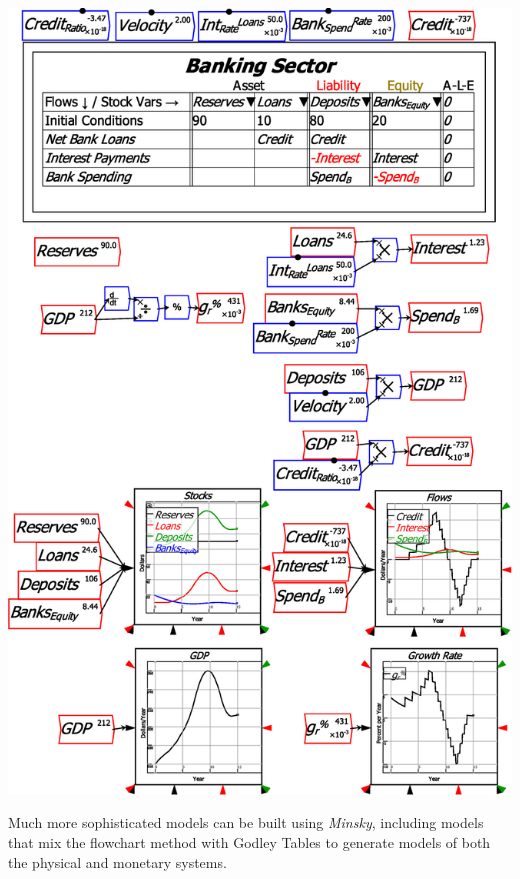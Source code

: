 \includegraphics{images/MonetaryModel01GodleyTable07GDP}

Much more sophisticated models can be built using \emph{Minsky}, including
models that mix the flowchart method with Godley Tables to generate
models of both the physical and monetary systems.
